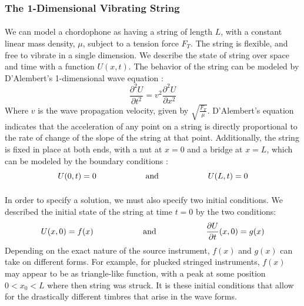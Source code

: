 \documentclass[12pt,letterpaper]{article}
\begin{document}
\subsubsection{The 1-Dimensional Vibrating String}

\paragraph*{}We can model a chordophone as having a string of length $L$, with a constant linear mass density, $\mu$, subject to a tension force $F_T$. The string is flexible, and free to vibrate in a single dimension. We describe the state of string over space and time with a function $U(x,t)$. The behavior of the string can be modeled by D'Alembert's 1-dimensional wave equation \cite{Haberman,Hunter,Taylor}:
\begin{equation}
\label{eqn-1DWaveEqn}
\frac{\partial^2 U}{\partial t^2} = v^2 \frac{\partial^2 U}{\partial x^2}
\end{equation}
Where $v$ is the wave propagation velocity, given by $\sqrt{\frac{F_T}{\mu}}$. D'Alembert's equation indicates that the acceleration of any point on a string is directly proportional to the rate of change of the slope of the string at that point. Additionally, the string is fixed in place at both ends, with a nut at $x = 0$ and a bridge at $x = L$, which can be modeled by the boundary conditions \cite{Olson,White,Haberman}:
\begin{equation}
U(0,t) = 0 
	\text{\hspace*{2cm} and \hspace*{2cm}}
U(L,t) = 0 
\end{equation}

\paragraph*{}In order to specify a solution, we must also specify two initial conditions. We described the initial state of the string at time $t = 0$  by the two conditions:
\begin{equation}
U(x,0) = f(x) 
	\text{\hspace*{2cm} and \hspace*{2cm}}
\frac{\partial U}{\partial t}(x,0) = g(x)
\end{equation}
Depending on the exact nature of the source instrument, $f(x)$ and $g(x)$ can take on different forms. For example, for plucked stringed instruments, $f(x)$ may appear to be as triangle-like function, with a peak at some position $0 < x_0 < L$ where then string was struck. It is these initial conditions that allow for the drastically different timbres that arise in the wave forms.
\end{document}
